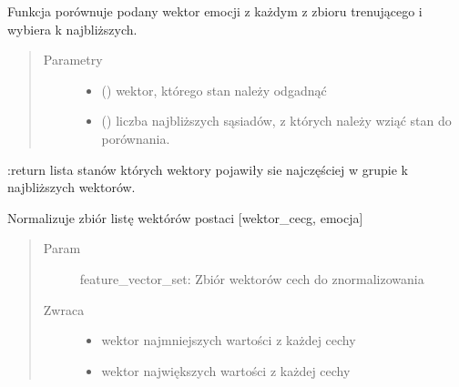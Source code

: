 \documentclass[letterpaper,10pt,polish]{sphinxmanual}
\begin{document}
\begin{fulllineitems}
\begin{fulllineitems}
\label{\detokenize{KNN:KNN.KNN.get_emotion}}
Funkcja porównuje podany wektor emocji z każdym z zbioru trenującego i wybiera k najbliższych.
\begin{quote}\begin{description}
\item[{Parametry}] \leavevmode\begin{itemize}
\item {} 
 () \textendash{} wektor, którego stan należy odgadnąć

\item {} 
 () \textendash{} liczba najbliższych sąsiadów, z których należy wziąć stan do porównania.

\end{itemize}

\end{description}\end{quote}

:return lista stanów których wektory pojawiły sie najczęściej w grupie k najbliższych wektorów.

\end{fulllineitems}


\begin{fulllineitems}
\label{\detokenize{KNN:KNN.KNN.normalize}}
Normalizuje zbiór listę wektórów postaci {[}wektor\_cecg, emocja{]}
\begin{quote}\begin{description}
\item[{Param}] \leavevmode
feature\_vector\_set: Zbiór wektorów cech do znormalizowania

\item[{Zwraca}] \leavevmode
\begin{itemize}
\item {} 
wektor najmniejszych wartości z każdej cechy

\item {} 
wektor największych wartości z każdej cechy

\end{itemize}


\end{description}\end{quote}

\end{fulllineitems}


\end{fulllineitems}
\end{document}
